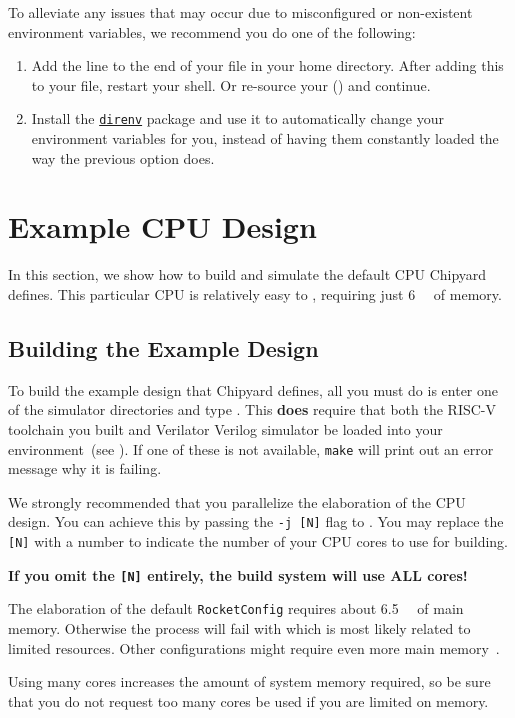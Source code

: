 To alleviate any issues that may occur due to misconfigured or non-existent environment variables, we recommend you do one of the following:
\begin{enumerate}
\item Add the line  to the end of your  file in your home directory.
  After adding this to your  file, restart your shell.
  Or re-source your  () and continue.
\item Install the \href{https://direnv.net/}{\texttt{direnv}} package and use it to automatically change your environment variables for you, instead of having them constantly loaded the way the previous option does.
\end{enumerate}

\section{Example CPU Design}\label{sec:Example_CPU_Design}
In this section, we show how to build and simulate the default CPU Chipyard defines.
This particular CPU is relatively easy to , requiring just \SI{6}{\giga\byte} of memory.

\subsection{Building the Example Design}\label{sec:Building_Example_Design}
To build the example design that Chipyard defines, all you must do is enter one of the simulator directories and type .
This \textbf{does} require that both the RISC-V toolchain you built and Verilator Verilog simulator be loaded into your environment~(see ).
If one of these is not available, \texttt{make} will print out an error message why it is failing.

\begin{blackbox}
  We strongly recommended that you parallelize the \gls{elaboration} of the CPU design.
  You can achieve this by passing the \texttt{-j [N]} flag to .
  You may replace the \texttt{[N]} with a number to indicate the number of your CPU cores to use for building.

  \textbf{If you omit the \texttt{[N]} entirely, the build system will use ALL cores!}

  The \gls{elaboration} of the default \texttt{RocketConfig} requires about \SI{6.5}{\giga\byte} of main memory.
  Otherwise the process will fail with  which is most likely related to limited resources.
  Other configurations might require even more main memory~\cite{chipyard}.

  Using many cores increases the amount of system memory required, so be sure that you do not request too many cores be used if you are limited on memory.
\end{blackbox}

